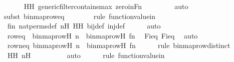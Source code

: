 \begin{isabellebody}
\ \ \ \ \isamarkupfalse%
\ HH\ generic{\isacharunderscore}{\kern0pt}filter{\isacharunderscore}{\kern0pt}contains{\isacharunderscore}{\kern0pt}max\ zero{\isacharunderscore}{\kern0pt}in{\isacharunderscore}{\kern0pt}Fn\isanewline
\ \ \ \ \ \ \ \isamarkupfalse%
\ auto{\isacharbrackleft}{\kern0pt}{}{\isacharbrackright}{\kern0pt}\isanewline
\ \ \ \ \ \isamarkupfalse%
{\isacharparenleft}{\kern0pt}subst\ binmap{\isacharunderscore}{\kern0pt}row{\isacharunderscore}{\kern0pt}eq{\isacharparenright}{\kern0pt}\isanewline
\ \ \ \ \ \ \ \isamarkupfalse%
{\isacharparenleft}{\kern0pt}rule\ function{\isacharunderscore}{\kern0pt}value{\isacharunderscore}{\kern0pt}in{\isacharparenright}{\kern0pt}\isanewline
\ \ \ \ \isamarkupfalse%
\ fin\ nat{\isacharunderscore}{\kern0pt}perms{\isacharunderscore}{\kern0pt}def\ nH\ HH\ bij{\isacharunderscore}{\kern0pt}def\ inj{\isacharunderscore}{\kern0pt}def\isanewline
\ \ \ \ \isamarkupfalse%
\ auto\isanewline
\ \ \ \ \isanewline
\ \ \isamarkupfalse%
\ roweq\ {\isacharcolon}{\kern0pt}\ {\isachardoublequoteopen}binmap{\isacharunderscore}{\kern0pt}row{\isacharparenleft}{\kern0pt}H{\isacharcomma}{\kern0pt}\ n{\isacharparenright}{\kern0pt}\ {\isacharequal}{\kern0pt}\ binmap{\isacharunderscore}{\kern0pt}row{\isacharparenleft}{\kern0pt}H{\isacharcomma}{\kern0pt}\ f{\isacharbackquote}{\kern0pt}n{\isacharparenright}{\kern0pt}{\isachardoublequoteclose}\ \isamarkupfalse%
\ Fieq{}\ Fieq{}\ \isamarkupfalse%
\ auto\isanewline
\isanewline
\ \ \isamarkupfalse%
\ rowneq{\isacharcolon}{\kern0pt}\ {\isachardoublequoteopen}binmap{\isacharunderscore}{\kern0pt}row{\isacharparenleft}{\kern0pt}H{\isacharcomma}{\kern0pt}\ n{\isacharparenright}{\kern0pt}\ {\isasymnoteq}\ binmap{\isacharunderscore}{\kern0pt}row{\isacharparenleft}{\kern0pt}H{\isacharcomma}{\kern0pt}\ f{\isacharbackquote}{\kern0pt}n{\isacharparenright}{\kern0pt}{\isachardoublequoteclose}\ \isanewline
\ \ \ \ \isamarkupfalse%
{\isacharparenleft}{\kern0pt}rule\ binmap{\isacharunderscore}{\kern0pt}row{\isacharunderscore}{\kern0pt}distinct{\isacharparenright}{\kern0pt}\isanewline
\ \ \ \ \isamarkupfalse%
\ HH\ nH\ \isanewline
\ \ \ \ \ \ \ \isamarkupfalse%
\ auto{\isacharbrackleft}{\kern0pt}{}{\isacharbrackright}{\kern0pt}\isanewline
\ \ \ \ \ \isamarkupfalse%
{\isacharparenleft}{\kern0pt}rule\ function{\isacharunderscore}{\kern0pt}value{\isacharunderscore}{\kern0pt}in{\isacharparenright}{\kern0pt}\isanewline

\end{isabellebody}
